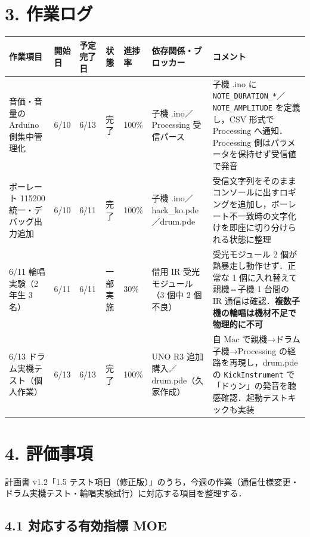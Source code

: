 \documentclass[a4paper,11pt]{ltjsarticle}
\providecommand{\％}{\%}
\begin{document}
\section{3. 作業ログ}

\renewcommand{\arraystretch}{1.4}

\begin{longtable}{|p{2.6cm}|p{1.4cm}|p{1.6cm}|p{1.4cm}|p{1cm}|p{2.4cm}|p{3.0cm}|}
\hline
\rowcolor[gray]{0.9}
作業項目 & 開始日 & 予定完了日 & 状態 & 進捗率 & 依存関係・ブロッカー & コメント \\
\hline
音価・音量の Arduino 側集中管理化 & 6/10 & 6/13 & 完了 & 100\％ & 子機 .ino／Processing 受信パース & 子機 .ino に \texttt{NOTE\_DURATION\_*}／\texttt{NOTE\_AMPLITUDE} を定義し，CSV 形式で Processing へ通知．Processing 側はパラメータを保持せず受信値で発音 \\
\hline
ボーレート 115200 統一・デバッグ出力追加 & 6/10 & 6/11 & 完了 & 100\％ & 子機 .ino／hack\_ko.pde／drum.pde & 受信文字列をそのままコンソールに出すロギングを追加し，ボーレート不一致時の文字化けを即座に切り分けられる状態に整理 \\
\hline
6/11 輪唱実験（2 年生 3 名） & 6/11 & 6/11 & 一部実施 & 30\％ & 借用 IR 受光モジュール（3 個中 2 個不良） & 受光モジュール 2 個が熱暴走し動作せず．正常な 1 個に入れ替えて親機⇔子機 1 台間の IR 通信は確認．\textbf{複数子機の輪唱は機材不足で物理的に不可} \\
\hline
6/13 ドラム実機テスト（個人作業） & 6/13 & 6/13 & 完了 & 100\％ & UNO R3 追加購入／drum.pde（久家作成） & 自 Mac で親機→ドラム子機→Processing の経路を再現し，drum.pde の \texttt{KickInstrument} で「ドゥン」の発音を聴感確認．起動テストキックも実装 \\
\hline
\end{longtable}

\section{4. 評価事項}

計画書 v1.2「1.5 テスト項目（修正版）」のうち，今週の作業（通信仕様変更・ドラム実機テスト・輪唱実験試行）に対応する項目を整理する．

\subsection*{4.1 対応する有効指標 MOE}
\end{document}
